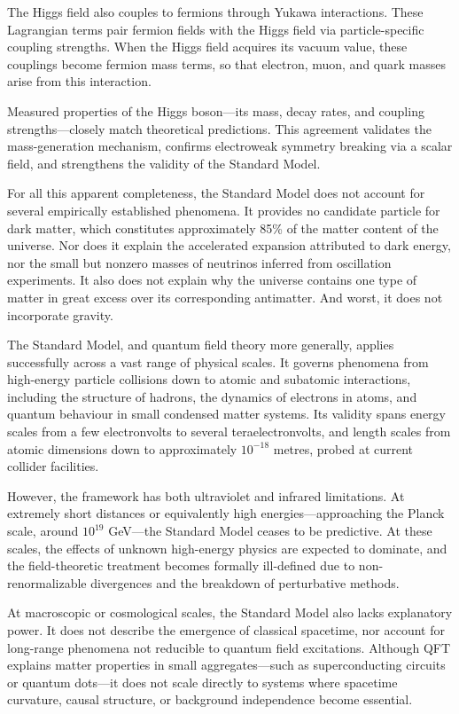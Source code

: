 The Higgs field also couples to fermions through Yukawa interactions. These Lagrangian terms pair fermion fields with the Higgs field via particle-specific coupling strengths. When the Higgs field acquires its vacuum value, these couplings become fermion mass terms, so that electron, muon, and quark masses arise from this interaction.

Measured properties of the Higgs boson—its mass, decay rates, and coupling strengths—closely match theoretical predictions. This agreement validates the mass-generation mechanism, confirms electroweak symmetry breaking via a scalar field, and strengthens the validity of the Standard Model.

For all this apparent completeness, the Standard Model does not account for several empirically established phenomena. It provides no candidate particle for dark matter, which constitutes approximately 85\% of the matter content of the universe. Nor does it explain the accelerated expansion attributed to dark energy, nor the small but nonzero masses of neutrinos inferred from oscillation experiments. It also does not explain why the universe contains one type of matter in great excess over its corresponding antimatter. And worst, it does not incorporate gravity.

The Standard Model, and quantum field theory more generally, applies successfully across a vast range of physical scales. It governs phenomena from high-energy particle collisions down to atomic and subatomic interactions, including the structure of hadrons, the dynamics of electrons in atoms, and quantum behaviour in small condensed matter systems. Its validity spans energy scales from a few electronvolts to several teraelectronvolts, and length scales from atomic dimensions down to approximately $10^{-18}$ metres, probed at current collider facilities.

However, the framework has both ultraviolet and infrared limitations. At extremely short distances or equivalently high energies—approaching the Planck scale, around $10^{19}$ GeV—the Standard Model ceases to be predictive. At these scales, the effects of unknown high-energy physics are expected to dominate, and the field-theoretic treatment becomes formally ill-defined due to non-renormalizable divergences and the breakdown of perturbative methods. 

At macroscopic or cosmological scales, the Standard Model also lacks explanatory power. It does not describe the emergence of classical spacetime, nor account for long-range phenomena not reducible to quantum field excitations. Although QFT explains matter properties in small aggregates—such as superconducting circuits or quantum dots—it does not scale directly to systems where spacetime curvature, causal structure, or background independence become essential.

